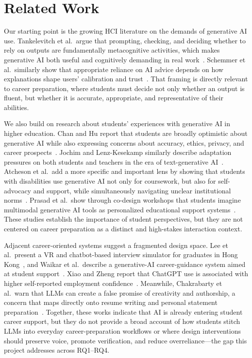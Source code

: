 \documentclass[sigconf,review,anonymous]{acmart}
\begin{document}
\section{Related Work}

Our starting point is the growing HCI literature on the demands of generative AI use. Tankelevitch et al.\ argue that prompting, checking, and deciding whether to rely on outputs are fundamentally metacognitive activities, which makes generative AI both useful and cognitively demanding in real work~\cite{tankelevitch2024metacognitive}. Schemmer et al.\ similarly show that appropriate reliance on AI advice depends on how explanations shape users' calibration and trust~\cite{schemmer2023appropriatereliance}. That framing is directly relevant to career preparation, where students must decide not only whether an output is fluent, but whether it is accurate, appropriate, and representative of their abilities.

We also build on research about students' experiences with generative AI in higher education. Chan and Hu report that students are broadly optimistic about generative AI while also expressing concerns about accuracy, ethics, privacy, and career prospects~\cite{chan2023studentsvoices}. Jochim and Lenz-Kesekamp similarly describe adaptation pressures on both students and teachers in the era of text-generative AI~\cite{jochim2024teachingtesting}. Atcheson et al.\ add a more specific and important lens by showing that students with disabilities use generative AI not only for coursework, but also for self-advocacy and support, while simultaneously navigating unclear institutional norms~\cite{atcheson2025disabilitygenai}. Prasad et al.\ show through co-design workshops that students imagine multimodal generative AI tools as personalized educational support systems~\cite{prasad2025multimodal}. These studies establish the importance of student perspectives, but they are not centered on career preparation as a distinct and high-stakes interaction context.

Adjacent career-oriented systems suggest a fragmented design space. Lee et al.\ present a VR and chatbot-based interview simulator for graduates in Hong Kong~\cite{lee2024vrinterview}, and Waikar et al.\ describe a generative-AI career-guidance system aimed at student support~\cite{waikar2024careerguidance}. Xiao and Zheng report that ChatGPT use is associated with higher self-reported employment confidence~\cite{xiao2025employmentconfidence}. Meanwhile, Chakrabarty et al.\ warn that LLMs can create a false promise of creativity and authorship, a concern that maps directly onto resume writing and personal statement preparation~\cite{chakrabarty2024artorartifice}. Together, these works indicate that AI is already entering student career support, but they do not provide a broad account of how students stitch LLMs into everyday career-preparation workflows or where design interventions should preserve voice, promote verification, and reduce overreliance---the gap this project addresses across RQ1--RQ4.
\end{document}
